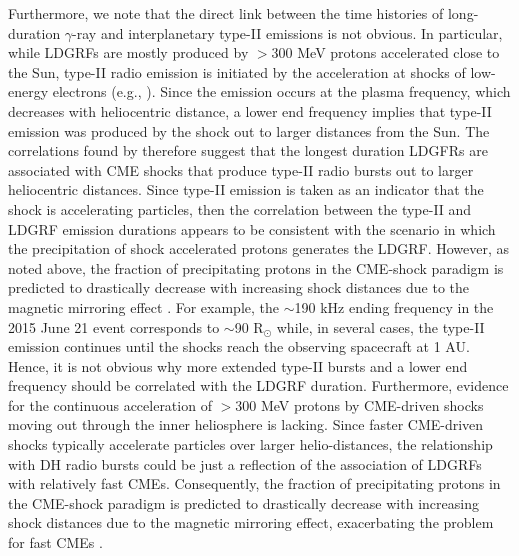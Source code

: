 \documentclass{aastex61}
\begin{document}
Furthermore, we note that the direct link between the time histories of long-duration $\gamma$-ray and interplanetary type-II emissions is not obvious.
In particular, while LDGRFs are mostly produced by $>$300 MeV protons accelerated 
close to the Sun, type-II radio emission is initiated by the acceleration at shocks of low-energy electrons (e.g., \citealp{ref:BALE1999}).  
Since the emission occurs at the plasma frequency, which decreases with heliocentric distance, a lower end frequency implies that type-II emission was produced by the shock out to larger distances from the Sun.  The correlations found by \citet{ref:GOPALSWAMY2018} therefore suggest that the longest duration LDGFRs are associated with CME shocks that produce type-II radio bursts out to larger heliocentric distances.  Since type-II emission is taken as an indicator that the shock is accelerating particles, then the correlation between the type-II and LDGRF emission durations appears to be consistent with the scenario in which the precipitation of shock accelerated protons generates the LDGRF. However, as noted above, the fraction of precipitating
protons in the CME-shock paradigm is predicted to drastically decrease with increasing shock distances due to the magnetic mirroring effect \citep{ref:HUTCHINSON2022}.  
For example, the $\sim$190 kHz ending frequency in the 2015 June 21 event corresponds to $\sim$90 R$_{\odot}$ \citep{ref:GOPALSWAMY2018}
while, in several cases, the type-II emission continues until the shocks reach the observing spacecraft at 1 AU.  Hence, it is not obvious why more extended type-II bursts and a lower end frequency should be correlated with the LDGRF duration. Furthermore, evidence for the continuous acceleration of $>$300 MeV protons by CME-driven shocks moving out through the inner heliosphere is lacking. 
Since faster CME-driven shocks typically accelerate particles over larger helio-distances, the relationship with DH radio bursts could be just a reflection of the association of LDGRFs with relatively fast CMEs. Consequently, the fraction of precipitating protons in the CME-shock paradigm is predicted to drastically decrease with increasing shock distances due to the magnetic mirroring effect, exacerbating the problem for fast CMEs \citep{ref:HUTCHINSON2022}.
\end{document}
